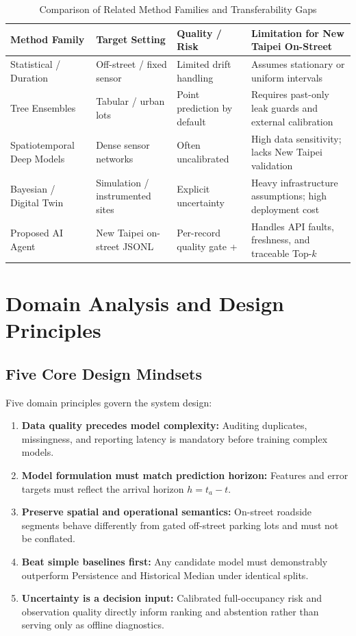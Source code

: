 \documentclass[conference,a4paper]{IEEEtran}
\begin{document}
\begin{table}[!t]
\caption{Comparison of Related Method Families and Transferability Gaps}
\label{tab:literature}
\centering
\scriptsize
\setlength{\tabcolsep}{3pt}
\begin{tabular}{p{1.6cm}p{1.55cm}p{1.65cm}p{2.2cm}}
\toprule
\textbf{Method Family} & \textbf{Target Setting} & \textbf{Quality / Risk} & \textbf{Limitation for New Taipei On-Street} \\
\midrule
Statistical / Duration & Off-street / fixed sensor & Limited drift handling & Assumes stationary or uniform intervals \\
Tree Ensembles \cite{breiman2001,chen2016} & Tabular / urban lots & Point prediction by default & Requires past-only leak guards and external calibration \\
Spatiotemporal Deep Models & Dense sensor networks & Often uncalibrated & High data sensitivity; lacks New Taipei validation \\
Bayesian / Digital Twin & Simulation / instrumented sites & Explicit uncertainty & Heavy infrastructure assumptions; high deployment cost \\
Proposed AI Agent & New Taipei on-street JSONL & Per-record quality gate + \cite{platt1999,zadrozny2002} & Handles API faults, freshness, and traceable Top-$k$ \\
\bottomrule
\end{tabular}
\end{table}

\section{Domain Analysis and Design Principles}\label{sec:domain}

\subsection{Five Core Design Mindsets}
Five domain principles govern the system design:
\begin{enumerate}
    \item \textbf{Data quality precedes model complexity:} Auditing duplicates, missingness, and reporting latency is mandatory before training complex models.
    \item \textbf{Model formulation must match prediction horizon:} Features and error targets must reflect the arrival horizon $h = t_a - t$.
    \item \textbf{Preserve spatial and operational semantics:} On-street roadside segments behave differently from gated off-street parking lots and must not be conflated.
    \item \textbf{Beat simple baselines first:} Any candidate model must demonstrably outperform Persistence and Historical Median under identical splits.
    \item \textbf{Uncertainty is a decision input:} Calibrated full-occupancy risk and observation quality directly inform ranking and abstention rather than serving only as offline diagnostics.
\end{enumerate}
\end{document}
